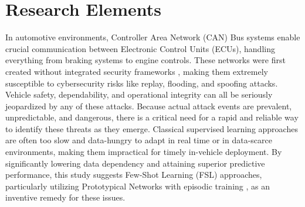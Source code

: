 \section{Research Elements}
\label{sec:research}

In automotive environments, Controller Area Network (CAN) Bus systems enable crucial communication between Electronic Control Units (ECUs), handling everything from braking systems to engine controls. These networks were first created without integrated security frameworks \cite{batista2023lococat}, making them extremely susceptible to cybersecurity risks like replay, flooding, and spoofing attacks. Vehicle safety, dependability, and operational integrity can all be seriously jeopardized by any of these attacks. Because actual attack events are prevalent, unpredictable, and dangerous, there is a critical need for a rapid and reliable way to identify these threats as they emerge. Classical supervised learning approaches are often too slow and data-hungry to adapt in real time or in data-scarce environments, making them impractical for timely in-vehicle deployment. By significantly lowering data dependency and attaining superior predictive performance, this study suggests Few-Shot Learning (FSL) approaches, particularly utilizing Prototypical Networks with episodic training \cite{sicara2023easyfsl}, as an inventive remedy for these issues.






